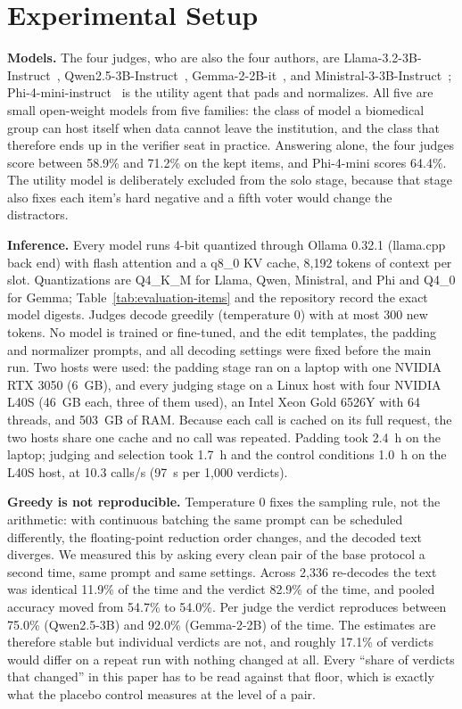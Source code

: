 \documentclass[conference]{IEEEtran}
\begin{document}
\section{Experimental Setup}
\textbf{Models.} The four judges, who are also the four authors, are Llama-3.2-3B-Instruct~\cite{b45}, Qwen2.5-3B-Instruct~\cite{b46}, Gemma-2-2B-it~\cite{b47}, and Ministral-3-3B-Instruct~\cite{b48}; Phi-4-mini-instruct~\cite{b40} is the utility agent that pads and normalizes. All five are small open-weight models from five families: the class of model a biomedical group can host itself when data cannot leave the institution, and the class that therefore ends up in the verifier seat in practice. Answering alone, the four judges score between 58.9\% and 71.2\% on the kept items, and Phi-4-mini scores 64.4\%. The utility model is deliberately excluded from the solo stage, because that stage also fixes each item's hard negative and a fifth voter would change the distractors.

\textbf{Inference.} Every model runs 4-bit quantized through Ollama 0.32.1 (llama.cpp back end) with flash attention and a q8\_0 KV cache, 8,192 tokens of context per slot. Quantizations are Q4\_K\_M for Llama, Qwen, Ministral, and Phi and Q4\_0 for Gemma; Table~\ref{tab:evaluation-items} and the repository record the exact model digests. Judges decode greedily (temperature 0) with at most 300 new tokens. No model is trained or fine-tuned, and the edit templates, the padding and normalizer prompts, and all decoding settings were fixed before the main run. Two hosts were used: the padding stage ran on a laptop with one NVIDIA RTX 3050 (6~GB), and every judging stage on a Linux host with four NVIDIA L40S (46~GB each, three of them used), an Intel Xeon Gold 6526Y with 64 threads, and 503~GB of RAM. Because each call is cached on its full request, the two hosts share one cache and no call was repeated. Padding took 2.4~h on the laptop; judging and selection took 1.7~h and the control conditions 1.0~h on the L40S host, at 10.3 calls/s (97~s per 1,000 verdicts).

\textbf{Greedy is not reproducible.} Temperature 0 fixes the sampling rule, not the arithmetic: with continuous batching the same prompt can be scheduled differently, the floating-point reduction order changes, and the decoded text diverges. We measured this by asking every clean pair of the base protocol a second time, same prompt and same settings. Across 2{,}336 re-decodes the text was identical 11.9\% of the time and the verdict 82.9\% of the time, and pooled accuracy moved from 54.7\% to 54.0\%. Per judge the verdict reproduces between 75.0\% (Qwen2.5-3B) and 92.0\% (Gemma-2-2B) of the time. The estimates are therefore stable but individual verdicts are not, and roughly 17.1\% of verdicts would differ on a repeat run with nothing changed at all. Every ``share of verdicts that changed'' in this paper has to be read against that floor, which is exactly what the placebo control measures at the level of a pair.
\end{document}
